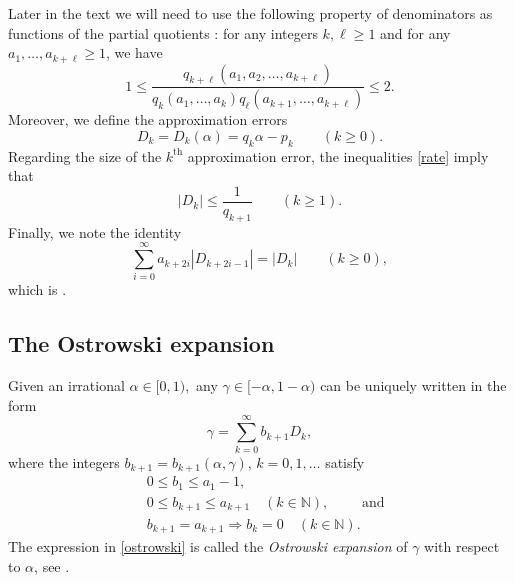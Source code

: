 \documentclass[12pt, reqno]{amsart}
\theoremstyle{definition}
\theoremstyle{remark}
\numberwithin{equation}{section}
\def\alp{{\alpha}} \def\bfalp{{\boldsymbol \alpha}}
\def\gam{{\gamma}} \def\Gam{{\Gamma}}
\def\le{\leqslant} \def\ge{\geqslant}
\def\ls{\leqslant} \def\gs{\geqslant}
\def \bN {\mathbb N}
\begin{document}
	Later in the text we will need to use the following property of denominators as functions of the partial quotients \cite[Equation (6)]{QR2003}: for any integers $k,\ell \gs 1$ and for any $a_1,\ldots, a_{k+\ell} \gs 1$, we have 
	\begin{equation} \label{concatenation}
		1 \ls \frac{q_{k+\ell}(a_1, a_2, \ldots, a_{k+\ell})}{q_{k}(a_1,\ldots,a_k) q_{\ell}(a_{k+1},\ldots,a_{k+\ell})} \ls 2.
	\end{equation}  
	Moreover, we define the approximation errors
	\[
	D_k = D_k(\alp) = q_k \alp - p_k
	\qquad (k \ge 0).
	\]
	Regarding the size of the $k^{\mathrm{th}}$ approximation error, the inequalities \eqref{rate} imply that  
	\begin{equation} \label{Dk_size}
		|D_k| \ls   \frac{1}{q_{k+1}}  \qquad (k\gs 1).  
	\end{equation}
	Finally, we note the identity
	\begin{equation} \label{EndpointIdentity}
		\sum_{i=0}^\infty a_{k+2i} |D_{k+2i-1}| = |D_k| \qquad (k \ge 0),
	\end{equation}
	which is \cite[Equation (3.7)]{BHV}.
	
	\subsection{The Ostrowski expansion}\label{Ostrowski_section} Given an irrational $\alp\in [0,1),$ any $\gam \in [-\alp,1-\alp)$ can be  uniquely written in the form 
	\begin{equation} \label{ostrowski}
		\gam = \sum_{k=0}^\infty b_{k+1} D_k, 
	\end{equation}
	where the integers $b_{k+1} = b_{k+1}(\alp,\gamma), \, k=0,1,\ldots$ satisfy
	\begin{align*}
		& 0 \le b_1 \le a_1 - 1, \\
		& 0 \le b_{k+1} \le a_{k+1} \quad (k \in \bN), \qquad \text{ and} \\
		& b_{k+1}  = a_{k+1} \Longrightarrow b_k = 0 \quad (k \in \bN).
	\end{align*}
	The expression in \eqref{ostrowski} is called the \emph{Ostrowski expansion} of $\gamma$ with respect to $\alp$, see \cite{BHV, RS1992}. 
	
\end{document}
